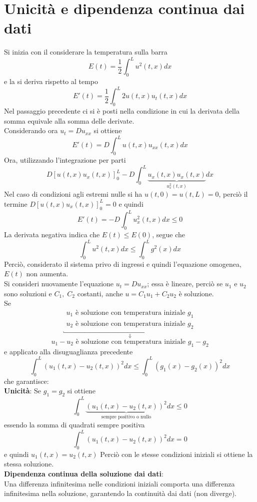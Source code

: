 \section{Unicit\`a e dipendenza continua dai dati}
Si inizia con il considerare la temperatura sulla barra
\[
	E(t)= \frac{1}{2}\int_0^L u^2 (t,x) dx
\]
e la si deriva rispetto al tempo
\[
	E'(t)= \frac{1}{2}\int_0^L 2u(t,x)u_t(t,x)dx
\]
Nel passaggio precedente ci si \`e posti nella condizione in cui la derivata
della somma equivale alla somma delle derivate.\\
Considerando ora $u_t=Du_{xx}$ si ottiene
\[
	E'(t)= D\int_0^L u(t,x)u_{xx}(t,x)dx
\]
Ora, utilizzando l'integrazione per parti
\[
	D\left[u(t,x)u_x(t,x)\right]_0^L - D\int_0^L
	\underbrace{u_x(t,x)u_x(t,x)}_{u_x^2(t,x)}dx
\]
Nel caso di condizioni agli estremi nulle si ha $u(t,0)=u(t,L)=0$, perci\`o il
termine $D\left[u(t,x)u_x(t,x)\right]_0^L=0$ e quindi
\[
	E'(t)= - D \int_0^L u_x^2(t,x) dx \leq 0
\]
La derivata negativa indica che $E(t)\leq E(0)$, segue che
\[
	\int_0^L u^2(t,x)dx \leq \int_0^L g^2 (x) dx
\]
Perci\`o, considerato il sistema privo di ingressi e quindi l'equazione
omogenea, $E(t)$ non aumenta. \\
Si consideri nuovamente l'equazione $u_t=Du_{xx}$; essa \`e lineare, perci\`o
se $u_1$ e $u_2$ sono soluzioni e $C_1,\; C_2$ costanti, anche $u=C_1u_1+C_2u_2$
\`e soluzione.\\
Se
\[
	\underbracket{
		\begin{array}{l}
			u_1 \text{ \`e soluzione con temperatura iniziale } g_1
\\
			u_2 \text{ \`e soluzione con temperatura iniziale } g_2
		\end{array}
		}_{\Downarrow}
\]
\[
	u_1-u_2 \text{ \`e soluzione con temperatura iniziale } g_1-g_2
\]
e applicato alla disuguaglianza precedente
\[
	\int_0^L \left(u_1(t,x)-u_2(t,x)\right)^2 dx
	\leq
	\int_0^L \left(g_1(x)-g_2(x)\right)^2 dx
\]
che garantisce:\\
{\bf Unicit\`a}: Se $g_1=g_2$ si ottiene
\[
	\int_0^L \underbrace{\left(u_1(t,x)-u_2(t,x)\right)^2}_\text{sempre
positivo o nullo} dx
	\leq 0
\]
essendo la somma di quadrati sempre positiva
\[
	\int_0^L \left(u_1(t,x)-u_2(t,x)\right)^2 dx
	= 0
\]
e quindi $u_1(t,x)=u_2(t,x)$
Perci\`o con le stesse condizioni iniziali si ottiene la stessa soluzione.\\
{\bf Dipendenza continua della soluzione dai dati}:\\
Una differenza infinitesima nelle condizioni iniziali comporta una differenza
infinitesima nella soluzione, garantendo la continuit\`a dai dati (non diverge).

